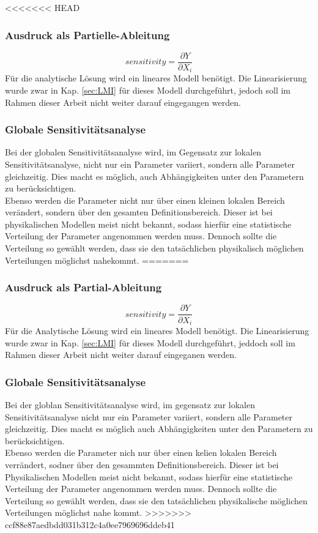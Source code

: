 <<<<<<< HEAD
\subsubsection*{Ausdruck als Partielle-Ableitung}
\begin{equation}
    sensitivity=\frac{\partial Y}{\partial X_i}
\end{equation}
Für die analytische Lösung wird ein lineares Modell benötigt. Die Linearisierung wurde zwar in Kap. \ref{sec:LMI} für dieses Modell durchgeführt, jedoch soll im Rahmen dieser Arbeit nicht weiter darauf eingegangen werden.
\subsubsection*{Globale Sensitivitätsanalyse}
Bei der globalen Sensitivitätsanalyse wird, im Gegensatz zur lokalen Sensitivitätsanalyse, nicht nur ein Parameter variiert, sondern alle Parameter gleichzeitig.
Dies macht es möglich, auch Abhängigkeiten unter den Parametern zu berücksichtigen. \\
Ebenso werden die Parameter nicht nur über einen kleinen lokalen Bereich verändert, sondern über den gesamten Definitionsbereich.
Dieser ist bei physikalischen Modellen meist nicht bekannt, sodass hierfür eine statistische Verteilung der Parameter angenommen werden muss.
Dennoch sollte die Verteilung so gewählt werden, dass sie den tatsächlichen physikalisch möglichen Verteilungen möglichst nahekommt.
=======
\subsubsection*{Ausdruck als Partial-Ableitung}
\begin{equation}
    sensitivity=\frac{\partial Y}{\partial X_i}
\end{equation}
Für die Analytische Lösung wird ein lineares Modell benötigt. Die Linearisierung wurde zwar in Kap. \ref{sec:LMI} für dieses Modell durchgeführt, jeddoch soll im Rahmen dieser Arbeit nicht weiter darauf eingeganen werden.
\subsubsection*{Globale Sensitivitätsanalyse}
Bei der globlan Sensitivitätsanalyse wird, im gegensatz zur lokalen Sensitivitätsanalyse nicht nur ein Parameter variiert, sondern alle Parameter gleichzeitig.
Dies macht es möglich auch Abhängigkeiten unter den Parametern zu berücksichtigen. \\
Ebenso werden die Parameter nich nur über einen kelien lokalen Bereich verrändert, sodner über den gesammten Definitionsbereich.
Dieser ist bei Physikalischen Modellen meist nicht bekannt, sodass hierfür eine statistische Verteilung der Parameter angenommen werden muss.
Dennoch sollte die Verteilung so gewählt werden, dass sie den tatsächlichen physikalische möglichen Verteilungen möglichst nahe kommt.
>>>>>>> ccf88e87aedbdd031b312c4a0ee7969696ddeb41

